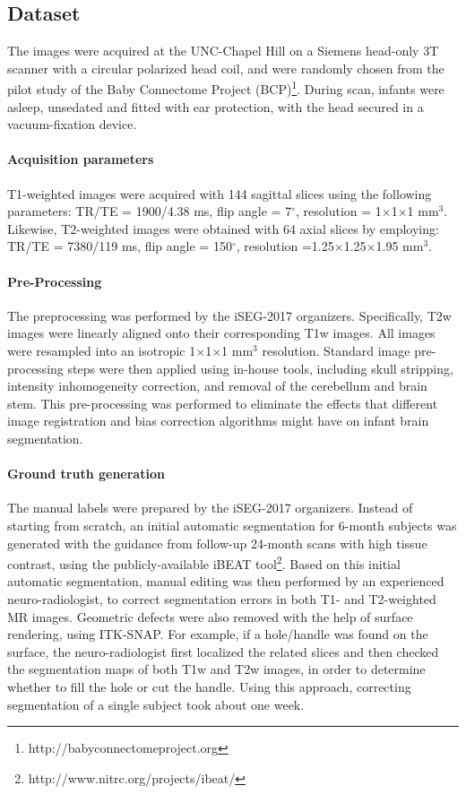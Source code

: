 \documentclass[twoside,espcrc2]{elsarticle}
\begin{document}
\subsection{Dataset}

The images were acquired at the UNC-Chapel Hill on a Siemens head-only 3T scanner with a circular polarized head coil, and were randomly chosen from the pilot study of the Baby Connectome Project (BCP)\footnote{http://babyconnectomeproject.org}. During scan, infants were asleep, unsedated and fitted with ear protection, with the head secured in a vacuum-fixation device.

\paragraph{Acquisition parameters}

T1-weighted images were acquired with 144 sagittal slices using the following parameters: TR/TE = 1900/4.38 ms, flip angle = 7$^\circ$, resolution = 1$\times$1$\times$1 mm$^3$. Likewise, T2-weighted images were obtained with 64 axial slices by employing: TR/TE = 7380/119 ms, flip angle = 150$^\circ$, resolution =1.25$\times$1.25$\times$1.95 mm$^3$.

\paragraph{Pre-Processing}

The preprocessing was performed by the iSEG-2017 organizers. Specifically, T2w images were linearly aligned onto their corresponding T1w images. All images were resampled into an isotropic 1$\times$1$\times$1 mm$^3$ resolution. Standard image pre-processing steps were then applied using in-house tools, including skull stripping, intensity inhomogeneity correction, and removal of the cerebellum and brain stem. This pre-processing was performed to eliminate the effects that different image registration and bias correction algorithms might have on infant brain segmentation. 

\paragraph{Ground truth generation}

The manual labels were prepared by the iSEG-2017 organizers. Instead of starting from scratch, an initial automatic segmentation for 6-month subjects \cite{wang2013longitudinally,wang20124d} was generated with the guidance from follow-up 24-month scans with high tissue contrast, using the publicly-available iBEAT tool\footnote{http://www.nitrc.org/projects/ibeat/}. Based on this initial automatic segmentation, manual editing was then performed by an experienced neuro-radiologist, to correct segmentation errors in both T1- and T2-weighted MR images. Geometric defects were also removed with the help of surface rendering, using ITK-SNAP. For example, if a hole/handle was found on the surface, the neuro-radiologist first localized the related slices and then checked the segmentation maps of both T1w and T2w images, in order to determine whether to fill the hole or cut the handle. Using this approach, correcting segmentation of a single subject took about one week.
\end{document}
